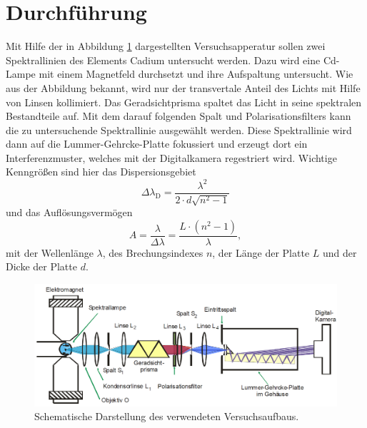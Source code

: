 \newpage
\section{Durchführung}
\label{sec:Durchführung}
Mit Hilfe der in Abbildung \ref{fig:Versuchsaufbau} dargestellten Versuchsapperatur sollen zwei
Spektrallinien des Elements Cadium untersucht werden. Dazu wird eine Cd-Lampe mit einem Magnetfeld
durchsetzt und ihre Aufspaltung untersucht. Wie aus der Abbildung
bekannt, wird nur der transvertale Anteil des Lichts mit Hilfe von Linsen kollimiert.
Das Geradsichtprisma spaltet das Licht in seine spektralen Bestandteile auf.
Mit dem darauf folgenden Spalt und Polarisationsfilters kann die zu untersuchende Spektrallinie ausgewählt werden.
Diese Spektrallinie wird dann auf die Lummer-Gehrcke-Platte fokussiert und erzeugt dort ein Interferenzmuster,
welches mit der Digitalkamera regestriert wird.
Wichtige Kenngrößen sind hier das Dispersionsgebiet
\begin{equation}
    \label{eqn:disp}
    \Delta \lambda_\text{D} = \frac{\lambda^2}{2 \cdot d \sqrt{n^2-1}}
\end{equation}
und das Auflösungsvermögen
\begin{equation}
    \label{eqn:auf}
    A = \frac{\lambda}{\Delta \lambda} = \frac{L \cdot \left(n^2 - 1\right)}{\lambda},
\end{equation}
mit der Wellenlänge $\lambda$, des Brechungsindexes $n$, der Länge der Platte $L$ und der
Dicke der Platte $d$.
\begin{figure}[htb]
  \centering
  \includegraphics[width=\textwidth]{content/pictures/Versuchsaufbau.png}
  \caption{Schematische Darstellung des verwendeten Versuchsaufbaus. \cite{anleitung_alt}}
  \label{fig:Versuchsaufbau}
\end{figure}

